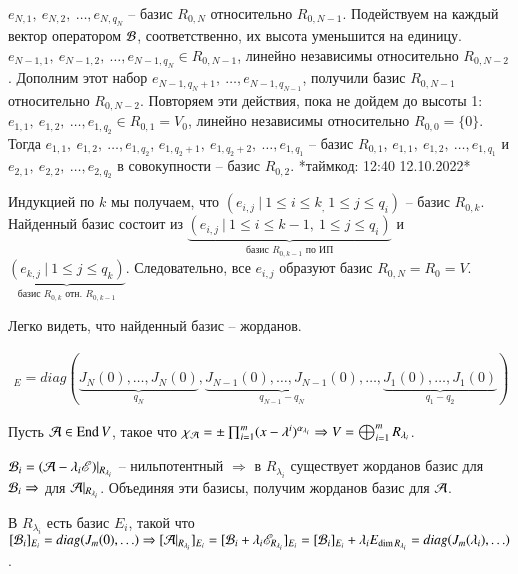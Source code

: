 \documentclass[main]{subfiles}
\begin{document}
$e_{N, 1}, \ e_{N, 2}, \ \ldots, e_{N, q_N}$ -- базис $R_{0, N}$ относительно $R_{0, N-1}$.
Подействуем на каждый вектор оператором $\mathcal{B}$, соответственно, их высота уменьшится на единицу.
$e_{N-1, 1}, \ e_{N-1, 2}, \ \ldots, e_{N-1, q_N} \in R_{0, N-1}$, линейно независимы относительно $ R_{0, N-2}$.
Дополним этот набор $e_{N-1, q_N+1}, \ \ldots, e_{N-1, q_{N-1}}$, получили базис  $R_{0, N-1}$ относительно $R_{0, N-2}$. Повторяем эти действия, пока не дойдем до высоты 1:
$e_{1, 1}, \ e_{1, 2}, \ \ldots, e_{1, q_2} \in R_{0, 1} = V_0$, линейно независимы относительно $ R_{0, 0} = \{0\}$.
Тогда $e_{1, 1}, \ e_{1, 2}, \ \ldots, e_{1, q_2}$, $e_{1, q_2+1}, \ e_{1, q_2+2}, \ \ldots, e_{1, q_1}$ -- базис $R_{0, 1}$,
$e_{1, 1}, \ e_{1, 2}, \ \ldots, e_{1, q_1}$ и $e_{2, 1}, \ e_{2, 2}, \ \ldots, e_{2, q_2}$ в совокупности -- базис $R_{0, 2}$. *таймкод: 12:40 12.10.2022*

Индукцией по $k$ мы получаем, что $(e_{i,j} \  | \ 1 \leq i \leq k_, \ 1 \leq j \leq q_i)$ -- базис $R_{0, k}$.
Найденный базис состоит из $\underbrace{(e_{i,j} \  | \ 1 \leq i \leq k-1, \ 1 \leq j \leq q_i)}_{\textrm{базис $R_{0, k-1}$ по ИП}}$
и $\underbrace{(e_{k,j} \  | \ 1 \leq j \leq q_k)}_{\textrm{базис $R_{0, k}$ отн. $R_{0, k-1}$}}$. Следовательно, все $e_{i,j}$ образуют базис
$R_{0, N} = R_0 = V$.

Легко видеть, что найденный базис -- жорданов.

\begin{gather*}
  [\mcb]_E = diag(\underbrace{J_N(0), \ldots, J_N(0)}_{q_N}, \underbrace{J_{N-1}(0), \ldots, J_{N-1}(0)}_{q_{N-1}-q_N}, \ldots, \underbrace{J_1(0), \ldots, J_1(0)}_{q_1-q_2})
\end{gather*}

Пусть $\mathcal{A} \in \operatorname{End} V$, такое что  $\chi_{\mathcal{A}} = \pm \prod_{i=1}^m (x-\lambda^i)^{\alpha_{\lambda_i}} \Rightarrow
  V = \bigoplus_{i=1}^m R_{\lambda_i}$.

$\mathcal{B}_i = (\mathcal{A} - \lambda_i\mathscr{E}) |_{R_{\lambda_i}}$ -- нильпотентный $\Rightarrow$ в $R_{\lambda_i}$ существует жорданов базис для $\mathcal{B}_i \Rightarrow$ для $\mathcal{A}|_{R_{\lambda_i}}$.
Объединяя эти базисы, получим жорданов базис для $\mathcal{A}$.

В $R_{\lambda_i}$ есть базис $E_i$, такой что $[\mathcal{B}_i]_{E_i} = diag(J_m(0), \ldots) \Rightarrow
  [\mathcal{A}|_{R_{\lambda_i}}]_{E_i} = [\mathcal{B}_i+\lambda_i \mathscr{E}_{R_{\lambda_i}}]_{E_i} =
    [\mathcal{B}_i]_{E_i}+ \lambda_i E_{\dim R_{\lambda_i}} = diag(J_m(\lambda_i), \ldots)$.
\end{document}
